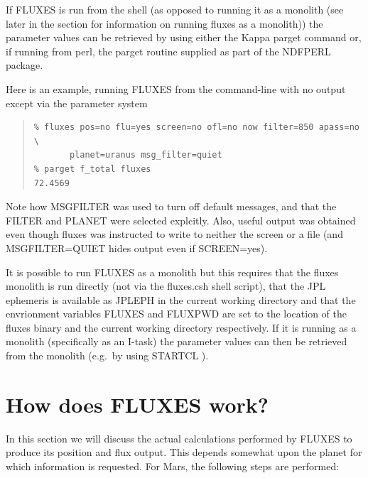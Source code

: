 \documentclass[11pt,twoside]{article}
\newenvironment{myquote}{\begin{quote}\begin{small}}{\end{small}\end{quote}}
\newcommand{\xref}[3]{#1}
\newcommand{\xlabel}[1]{}
\renewcommand{\_}{\texttt{\symbol{95}}}
\begin{document}
If FLUXES is run from the shell (as opposed to running it as a
monolith (see later in the section for information on running fluxes
as a monolith)) the parameter values can be retrieved by using either
the \xref{Kappa}{sun95}{} \xref{parget}{sun95}{PARGET} command
or, if running from perl, the par\_get routine supplied as part of the
\xref{NDFPERL}{sun222}{} package.

Here is an example, running FLUXES from the command-line with
no output except via the parameter system

\begin{myquote}
\begin{verbatim}
% fluxes pos=no flu=yes screen=no ofl=no now filter=850 apass=no \
       planet=uranus msg_filter=quiet
% parget f_total fluxes
72.4569
\end{verbatim}
\end{myquote}

Note how MSG\_FILTER was used to turn off default messages, and
that the FILTER and PLANET were selected explcitly. Also, useful
output was obtained even though fluxes was instructed to write
to neither the screen or a file (and MSG\_FILTER=QUIET hides
output even if SCREEN=yes).

 
It is possible to run FLUXES as a monolith but this requires
that the fluxes monolith is run directly (not via the fluxes.csh
shell script), that the JPL ephemeris is available as JPLEPH in the
current working directory and that the envrionment variables
FLUXES and FLUXPWD are set to the location of the fluxes binary
and the current working directory respectively. If it is running
as a monolith (specifically as an I-task) the parameter values can 
then be retrieved from the monolith (e.g.\ by using 
\xref{STARTCL}{sun186}{adam_message_system_extension} ).

\section{How does FLUXES work?}
\xlabel{howfluxesworks}
\label{sec:howfluxesworks}

In this section we will discuss the actual calculations performed by FLUXES to produce its position and flux output.  This depends somewhat upon the planet for which information is requested.  For Mars, the following steps are performed:
\end{document}
